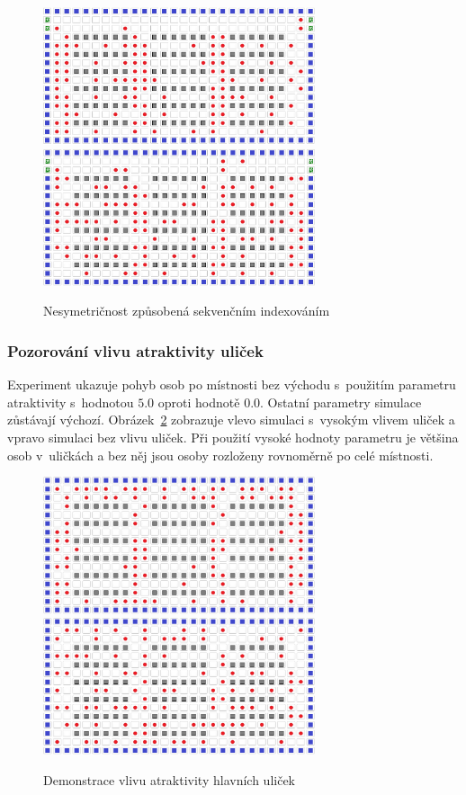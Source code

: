 \documentclass[11pt, titlepage, a4paper]{article}
\begin{document}
        \begin{figure}[H]
            \includegraphics[width=8cm]{BugFixes/index_seq_bug}
            \includegraphics[width=8cm]{BugFixes/index_seq_bug_fixed}
            \caption{Nesymetričnost způsobená sekvenčním indexováním}
            \label{indexBug}
        \end{figure}

        \subsubsection{Pozorování vlivu atraktivity uliček}
        Experiment ukazuje pohyb osob po místnosti bez východu s~použitím parametru atraktivity s~hodnotou $5.0$ oproti hodnotě $0.0$. Ostatní parametry simulace zůstávají výchozí. Obrázek~\ref{testAisle} zobrazuje vlevo simulaci s~vysokým vlivem uliček a vpravo simulaci bez vlivu uliček. Při použití vysoké hodnoty parametru je většina osob v~uličkách a bez něj jsou osoby rozloženy rovnoměrně po celé místnosti.\\

        \begin{figure}[H]
            \includegraphics[width=8cm]{TestParams/highAisle}
            \includegraphics[width=8cm]{TestParams/noAisle}
            \caption{Demonstrace vlivu atraktivity hlavních uliček}
            \label{testAisle}
        \end{figure}
\end{document}

